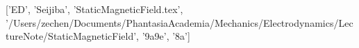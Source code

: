 ['ED', 'Seijiba', 'StaticMagneticField.tex', '/Users/zechen/Documents/PhantasiaAcademia/Mechanics/Electrodynamics/LectureNote/StaticMagneticField', '\x9a\x9e\xad{}', '\x8a\xbf']

